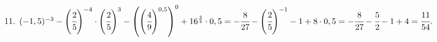 11. $(-1,5)^{-3}-\left(\cfrac{2}{5}\right)^{-4}\cdot\left(\cfrac{2}{5}\right)^{3}-\left(\left(\cfrac{4}{9}\right)^{0,5}\right)^0+16^{\frac{3}{4}}\cdot0,5=
-\cfrac{8}{27}-\left(\cfrac{2}{5}\right)^{-1}-1+8\cdot0,5=
-\cfrac{8}{27}-\cfrac{5}{2}-1+4=\cfrac{11}{54}.$\\
